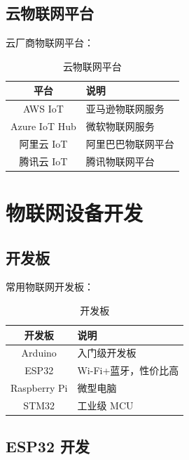 \documentclass[12pt,UTF8]{ctexbook}
\begin{document}
\section{云物联网平台}
\label{sec:cloud_platforms}

云厂商物联网平台：
\begin{table}[htbp]
    \centering
    \caption{云物联网平台}
    \begin{tabular}{|c|p{8cm}|}
        \hline
        \textbf{平台} & \textbf{说明} \\
        \hline
        AWS IoT & 亚马逊物联网服务 \\
        \hline
        Azure IoT Hub & 微软物联网服务 \\
        \hline
       阿里云 IoT & 阿里巴巴物联网平台 \\
        \hline
       腾讯云 IoT & 腾讯物联网平台 \\
        \hline
    \end{tabular}
\end{table}

\chapter{物联网设备开发}
\label{chap:device_development}

\section{开发板}
\label{sec:development_boards}

常用物联网开发板：
\begin{table}[htbp]
    \centering
    \caption{开发板}
    \begin{tabular}{|c|p{8cm}|}
        \hline
        \textbf{开发板} & \textbf{说明} \\
        \hline
        Arduino & 入门级开发板 \\
        \hline
        ESP32 & Wi-Fi+蓝牙，性价比高 \\
        \hline
        Raspberry Pi & 微型电脑 \\
        \hline
        STM32 & 工业级 MCU \\
        \hline
    \end{tabular}
\end{table}

\section{ESP32 开发}
\label{sec:esp32_development}
\end{document}
